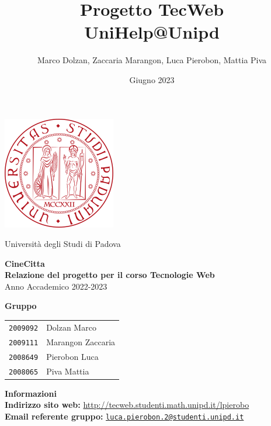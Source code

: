 \documentclass[a4paper, 11pt]{article}
\title{Progetto TecWeb \\ UniHelp@Unipd}
\author{Marco Dolzan, Zaccaria Marangon, Luca Pierobon, Mattia Piva}
\date{Giugno 2023}
\begin{document}
\begin{titlepage}
    
    \begin{center}
        \includegraphics[width=0.25\linewidth]{logo_unipd.png}
        
        Università degli Studi di Padova
        
        \vspace{2cm}

        \textbf{\Huge{CineCitta}}\\[1cm]

        \textbf{\huge{Relazione del progetto per il corso Tecnologie Web}}\\[0.2cm]
        \Large{Anno Accademico 2022-2023}

        \vspace{1cm}

        \textbf{\Large{Gruppo}}
        \begin{table}[H]
            \centering
            \begin{tabular}{r | l}
                \texttt{2009092} & Dolzan Marco\\
                \texttt{2009111} & Marangon Zaccaria\\
                \texttt{2008649} & Pierobon Luca\\
                \texttt{2008065} & Piva Mattia\\
            \end{tabular}
        \end{table}

        \vspace{1cm}

        \textbf{\Large{Informazioni}}\\[0.2cm]
        \textbf{Indirizzo sito web:} \url{http://tecweb.studenti.math.unipd.it/lpierobo}\\
        \textbf{Email referente gruppo:} \href{mailto:luca.pierobon.2@studenti.unipd.it}{\texttt{luca.pierobon.2@studenti.unipd.it}} \\
        
        \vspace{1cm}
        

\end{center}
\end{titlepage}
\end{document}
